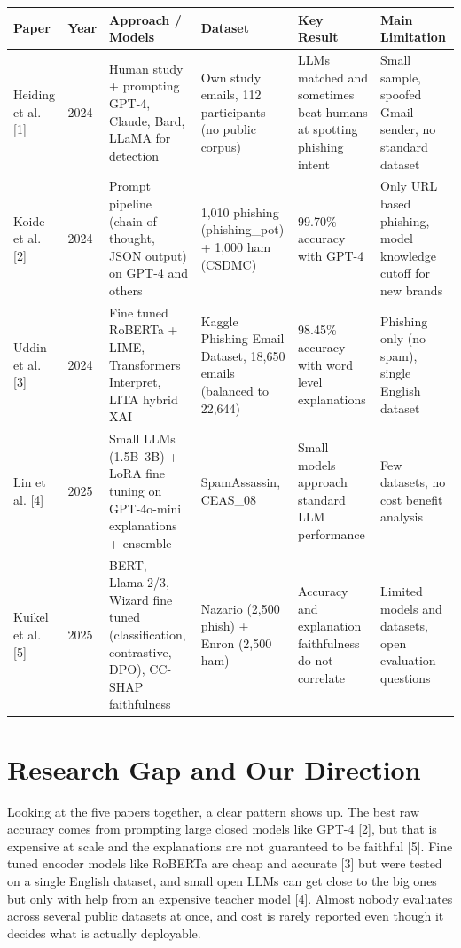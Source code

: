 \documentclass[10pt,a4paper]{article}
\begin{document}
\begin{table}[h]
\footnotesize
\begin{tabularx}{\textwidth}{@{}p{2.1cm}p{0.7cm}XXXX@{}}
\toprule
\textbf{Paper} & \textbf{Year} & \textbf{Approach / Models} & \textbf{Dataset} & \textbf{Key Result} & \textbf{Main Limitation}\\
\midrule
Heiding et al. [1] & 2024 & Human study + prompting GPT-4, Claude, Bard, LLaMA for detection & Own study emails, 112 participants (no public corpus) & LLMs matched and sometimes beat humans at spotting phishing intent & Small sample, spoofed Gmail sender, no standard dataset\\
\addlinespace
Koide et al. [2] & 2024 & Prompt pipeline (chain of thought, JSON output) on GPT-4 and others & 1,010 phishing (phishing\_pot) + 1,000 ham (CSDMC) & 99.70\% accuracy with GPT-4 & Only URL based phishing, model knowledge cutoff for new brands\\
\addlinespace
Uddin et al. [3] & 2024 & Fine tuned RoBERTa + LIME, Transformers Interpret, LITA hybrid XAI & Kaggle Phishing Email Dataset, 18,650 emails (balanced to 22,644) & 98.45\% accuracy with word level explanations & Phishing only (no spam), single English dataset\\
\addlinespace
Lin et al. [4] & 2025 & Small LLMs (1.5B--3B) + LoRA fine tuning on GPT-4o-mini explanations + ensemble & SpamAssassin, CEAS\_08 & Small models approach standard LLM performance & Few datasets, no cost benefit analysis\\
\addlinespace
Kuikel et al. [5] & 2025 & BERT, Llama-2/3, Wizard fine tuned (classification, contrastive, DPO), CC-SHAP faithfulness & Nazario (2,500 phish) + Enron (2,500 ham) & Accuracy and explanation faithfulness do not correlate & Limited models and datasets, open evaluation questions\\
\bottomrule
\end{tabularx}
\end{table}

\section{Research Gap and Our Direction}

Looking at the five papers together, a clear pattern shows up. The best raw accuracy comes from prompting large closed models like GPT-4 [2], but that is expensive at scale and the explanations are not guaranteed to be faithful [5]. Fine tuned encoder models like RoBERTa are cheap and accurate [3] but were tested on a single English dataset, and small open LLMs can get close to the big ones but only with help from an expensive teacher model [4]. Almost nobody evaluates across several public datasets at once, and cost is rarely reported even though it decides what is actually deployable.
\end{document}
